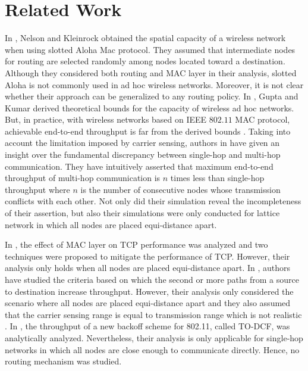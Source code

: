 \documentclass[12pt, draftclsnofoot, onecolumn]{IEEEtran}
\begin{document}
\section{Related Work}
\label{relatedWork}

In \cite{nelson1984spatial}, Nelson and Kleinrock obtained the spatial capacity of a wireless network when using slotted Aloha Mac protocol. They assumed that intermediate nodes for routing are selected randomly among nodes located toward a destination. Although they considered both routing and MAC layer in their analysis, slotted Aloha is not commonly used in ad hoc wireless networks. Moreover, it is not clear whether their approach can be generalized to any routing policy.
In \cite{ref7}, Gupta and Kumar derived theoretical bounds for the 
capacity of wireless ad hoc networks. But, in practice, with wireless 
networks based on IEEE $802.11$ MAC protocol, achievable end-to-end 
throughput is far from the derived bounds \cite{ref17}. Taking into 
account the limitation imposed by carrier sensing, authors in \cite{ref20} 
have given an insight over the fundamental discrepancy between single-hop 
and multi-hop communication. They have intuitively asserted that maximum 
end-to-end throughput of multi-hop communication is $n$ times less than 
single-hop throughput where $n$ is the number of consecutive nodes 
whose transmission conflicts with each other. Not only did their simulation 
reveal the incompleteness of their assertion, but also their simulations were 
only conducted for lattice network in which all nodes are placed equi-distance 
apart.

In \cite{ref21}, the effect of MAC layer on TCP performance was analyzed 
and two techniques were proposed to mitigate the performance of TCP. 
However, their analysis only holds when all nodes are placed equi-distance apart. 
In \cite{ref12,ref23}, authors have studied the criteria based on which the 
second or more paths from a source to destination increase throughput. 
However, their analysis only considered the scenario where all nodes are 
placed equi-distance apart and they also assumed that the carrier sensing 
range is equal to transmission range which is not realistic \cite{ref13}.
In \cite{fitzgerald2017analytic}, the throughput of a new backoff scheme for 802.11, called TO-DCF,
was analytically analyzed. Nevertheless, their analysis is only applicable for single-hop networks
in which all nodes are close enough to communicate directly. Hence, no routing mechanism was studied.
\end{document}
